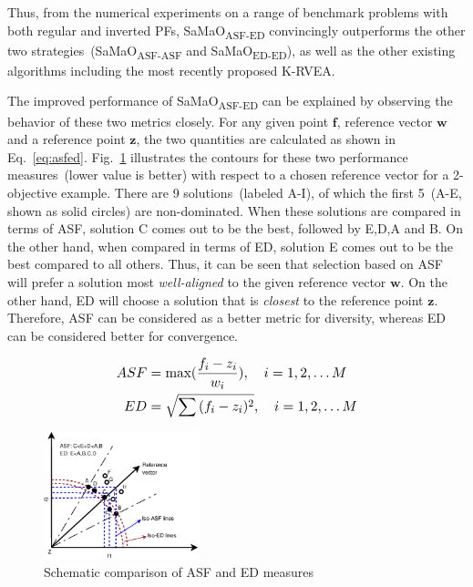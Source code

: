 \documentclass[twocolumn,10pt]{asme2ej}
\begin{document}
Thus, from the numerical experiments on a range of benchmark problems with both regular and inverted PFs, SaMaO\textsubscript{ASF-ED} convincingly outperforms the other two strategies~(SaMaO\textsubscript{ASF-ASF} and SaMaO\textsubscript{ED-ED}), as well as the other existing algorithms including the most recently proposed K-RVEA. 

The improved performance of SaMaO\textsubscript{ASF-ED} can be explained by observing the behavior of these two metrics closely. For any given point $\mathbf{f}$, reference vector $\mathbf{w}$ and a reference point $\mathbf{z}$, the two quantities are calculated as shown in Eq.~\ref{eq:asfed}. {\color{blue}Fig.~\ref{fig:compareasfed}} illustrates the contours for these two performance measures~(lower value is better) with respect to a chosen reference vector for a 2-objective example. There are 9 solutions~(labeled A-I), of which the first 5~(A-E, shown as solid circles) are non-dominated. When these solutions are compared in terms of ASF, solution C comes out to be the best, followed by E,D,A and B. On the other hand, when compared in terms of ED, solution E comes out to be the best compared to all others. Thus, it can be seen that selection based on ASF will prefer a solution most \emph{well-aligned} to the given reference vector $\mathbf{w}$. On the other hand, ED will choose a solution that is \emph{closest} to the reference point $\mathbf{z}$. Therefore, ASF can be considered as a better metric for diversity, whereas ED can be considered better for convergence. 

\begin{equation}\footnotesize
\begin{aligned}
ASF & = \text{max}(\frac{f_i-z_i}{w_i}), \quad i=1,2,\ldots M\\
ED & = \sqrt{\sum{(f_i-z_i)^2}}, \quad i=1,2,\ldots M\\
\end{aligned}
\label{eq:asfed}
\end{equation}

\begin{figure}[!htb]
	\centering    
	\includegraphics[width = 0.4\textwidth]{figures/asfed.eps}   
	\caption{Schematic comparison of ASF and ED measures}
	\label{fig:compareasfed}
\end{figure}
\end{document}
